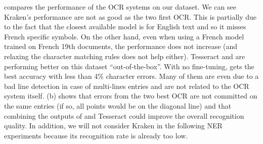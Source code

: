 %
 compares the performance of the OCR systems on our dataset. We can see Kraken's performance are
not as good as the two first OCR. This is partially due to the fact that the closest available model is for English text
and so it misses French specific symbols. On the other hand, even when using a French model trained on French 19th
documents, the performance does not increase (and relaxing the character matching rules does not help either). Tesseract and
\peroocr are performing better on this dataset ``out-of-the-box''. With no fine-tuning, \peroocr gets the best accuracy
with less than 4\% character errors. Many of them are even due to a bad line detection in case of multi-lines entries
and are not related to the OCR system itself.  (b) shows that errors from the two best OCR are not
committed on the same entries (if so, all points would be on the diagonal line) and that combining the outputs of
\peroocr and Tesseract could improve the overall recognition quality. 
In addition, we will not consider Kraken in the following NER experiments because its recognition rate is already too low.

